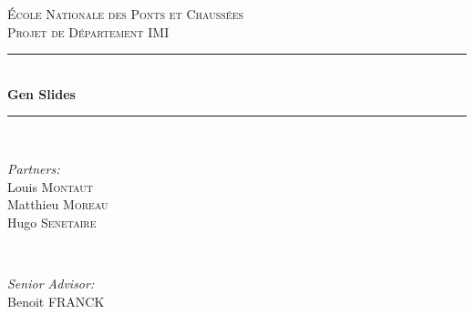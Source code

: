 \documentclass[12pt]{article}
\date{Mai 2018}
\begin{document}
\begin{titlepage}

\newcommand{\HRule}{\rule{\linewidth}{0.5mm}} %

\center %
 

\textsc{\LARGE École Nationale des Ponts et Chaussées}\\[1.5cm] %
\textsc{\Large Projet de Département IMI}\\[0.5cm] %


\HRule \\[0.4cm]
{ \huge \bfseries Gen Slides}\\[0.4cm] %
\HRule \\[1.5cm]
 

\begin{minipage}{0.4\textwidth}
\begin{flushleft} \large
\emph{Partners:}\\
Louis \textsc{Montaut}\\ Matthieu \textsc{Moreau}\\ Hugo \textsc{Senetaire}
\end{flushleft}
\end{minipage}
~
\begin{minipage}{0.4\textwidth}
\begin{flushright} \large
\emph{Senior Advisor:} \\
Benoit \textsc{FRANCK} %
\end{flushright}
\end{minipage}\\[2cm]


\end{titlepage}
\end{document}
